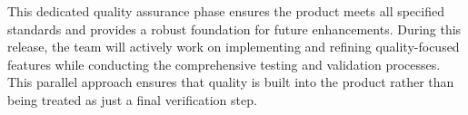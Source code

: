 This dedicated quality assurance phase ensures the product meets all specified standards and provides a robust foundation for future enhancements. During this release, the team will actively work on implementing and refining quality-focused features while conducting the comprehensive testing and validation processes. This parallel approach ensures that quality is built into the product rather than being treated as just a final verification step.
